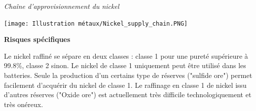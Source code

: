 \begin{multicols}{2}
    \begin{center}
        \textit{Chaîne d'approvisionnement du nickel}
    \end{center}
    \texttt{[image: Illustration métaux/Nickel\_supply\_chain.PNG]}
    \begin{center}
    \textbf{Risques spécifiques}
    \end{center}
    Le nickel raffiné se sépare en deux classes : classe 1 pour une pureté supérieure à 99.8\%, classe 2 sinon.
    Le nickel de classe 1 uniquement peut être utilisé dans les batteries. Seule la production d'un certains type 
    de réserves ("sulfide ore") permet facilement d'acquérir du nickel de classe 1. Le raffinage en classe 1 de
    nickel issu d'autres réserves ("Oxide ore") est actuellement très difficile technologiquement et très onéreux.
\end{multicols}

